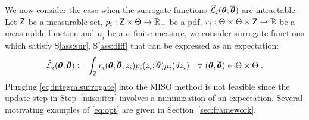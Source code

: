 \documentclass[11pt]{article}
\makeatletter
\theoremstyle{t}
\DeclareRobustCommand*\cal{\@fontswitch\relax\mathcal}
\makeatother
\begin{document}
We now consider the case when the surrogate functions $\sur{i}{\param}{\op}$ are intractable. 
Let $\Zset$ be a measurable set, $p_i : \Zset \times \Param \rightarrow \rset_+$ be a pdf, $r_i : \Param \times \Param \times \Zset \rightarrow \rset$ be a measurable function and $\mu_i$ be a $\sigma$-finite measure, we consider surrogate functions which satisfy S\ref{ass:sur}, S\ref{ass:diff} that can be expressed as an expectation:
\begin{equation}\label{eq:integralsurrogate}
\sur{i}{\param}{\op} \eqdef \int_{\Zset}{\rsur{i}{\param}{\op}{z_i}  p_i(z_i ; \op)\mu_i(dz_i)}\quad \forall~(\param,\op) \in \Param \times \Param \eqsp.
\end{equation}
Plugging \eqref{eq:integralsurrogate} into the MISO method is not feasible since the update step in Step~\ref{miso:iter} involves a minimization of an expectation.
Several motivating examples of \eqref{eq:opt} are given in Section~\ref{sec:framework}.
\end{document}
